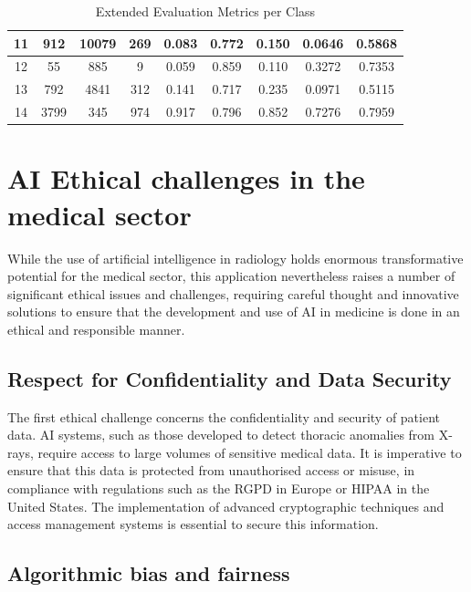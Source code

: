 \documentclass[12pt,oneside]{book} %
\begin{document}
\begin{table}[H]
\begin{tabular}{|c|c|c|c|c|c|c|c|c|}
        11             & 912         & 10079       & 269         & 0.083              & 0.772           & 0.150             & 0.0646       & 0.5868           \\ \hline
        12             & 55          & 885         & 9           & 0.059              & 0.859           & 0.110             & 0.3272       & 0.7353           \\ \hline
        13             & 792         & 4841        & 312         & 0.141              & 0.717           & 0.235             & 0.0971       & 0.5115           \\ \hline
        14             & 3799        & 345         & 974         & 0.917              & 0.796           & 0.852             & 0.7276       & 0.7959           \\ \hline
    \end{tabular}
    \caption{Extended Evaluation Metrics per Class}
    \label{tab:extended_metrics}
\end{table}

\section{AI Ethical challenges in the medical sector}

While the use of artificial intelligence in radiology holds enormous
transformative potential for the medical sector, this application nevertheless
raises a number of significant ethical issues and challenges, requiring careful
thought and innovative solutions to ensure that the development and use of AI
in medicine is done in an ethical and responsible manner.

\subsection{Respect for Confidentiality and Data Security}

The first ethical challenge concerns the confidentiality and security of
patient data. AI systems, such as those developed to detect thoracic anomalies
from X-rays, require access to large volumes of sensitive medical data. It is
imperative to ensure that this data is protected from unauthorised access or
misuse, in compliance with regulations such as the RGPD in Europe or HIPAA in
the United States. The implementation of advanced cryptographic techniques and
access management systems is essential to secure this information.

\subsection{Algorithmic bias and fairness}
\end{document}
